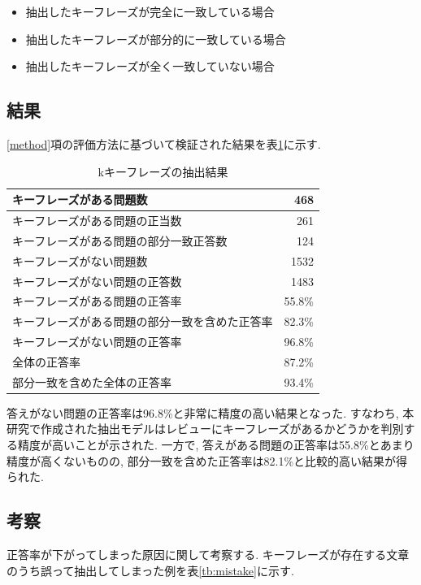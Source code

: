 \begin{itemize}
  \item 抽出したキーフレーズが完全に一致している場合
  \item 抽出したキーフレーズが部分的に一致している場合
  \item 抽出したキーフレーズが全く一致していない場合
\end{itemize}

\subsection{結果}
\ref{method}項の評価方法に基づいて検証された結果を表\ref{tb:qa}に示す. 

\begin{table}[H]
  \caption{kキーフレーズの抽出結果}
  \small
  \label{tb:qa}
  \begin{center}
  \begin{tabularx}{\linewidth}{X|r}
    \hline
    キーフレーズがある問題数&468\\\hline
    キーフレーズがある問題の正当数&261\\\hline
    キーフレーズがある問題の部分一致正答数&124\\\hline
    キーフレーズがない問題数&1532\\\hline
    キーフレーズがない問題の正答数&1483\\\hline\hline
    キーフレーズがある問題の正答率&55.8\%\\\hline
    キーフレーズがある問題の部分一致を含めた正答率&82.3\%\\\hline
    キーフレーズがない問題の正答率&96.8\%\\\hline\hline
    全体の正答率&87.2\%\\\hline
    部分一致を含めた全体の正答率&93.4\%\\\hline
  \end{tabularx}\end{center}
\end{table}

答えがない問題の正答率は96.8\%と非常に精度の高い結果となった. すなわち, 本研究で作成された抽出モデルはレビューにキーフレーズがあるかどうかを判別する精度が高いことが示された. 
一方で, 答えがある問題の正答率は55.8\%とあまり精度が高くないものの, 部分一致を含めた正答率は82.1\%と比較的高い結果が得られた. 

\subsection{考察}
正答率が下がってしまった原因に関して考察する. 
キーフレーズが存在する文章のうち誤って抽出してしまった例を表\ref{tb:mistake}に示す.

